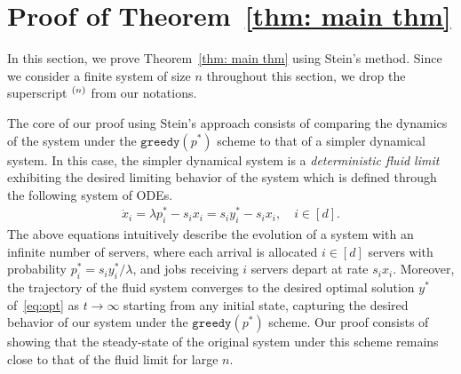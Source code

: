 \documentclass[a4paper]{article}
\theoremstyle{plain}
\newtheorem{remark}{Remark}
\theoremstyle{definition}
\theoremstyle{case}
\theoremstyle{remark}
\newcommand{\brac}[1]{\left(#1\right)}
\begin{document}
\section{Proof of Theorem~\ref{thm: main thm}}
\label{section: proofs}

In this section, we prove Theorem~\ref{thm: main thm} using Stein's method. 
Since we consider a finite system of size $n$ throughout this section, we drop the superscript $\vphantom{\cdot}^{(n)}$ from our notations.


The core of our proof using Stein’s approach consists of comparing the dynamics of the system under the $\texttt{greedy}(p^{*})$ scheme to that of a simpler dynamical system. In this case, the simpler dynamical system is a {\em deterministic fluid limit} exhibiting the desired limiting behavior of the system %
which is defined through the following system of ODEs.
\begin{align} \label{eq: ode_sub}
    \dot{x}_i  =  \lambda p_i^* -s_i x_i=s_i y_i^*-s_i x_i, \quad i \in [d].
\end{align}
% 
The above equations intuitively describe the evolution of a system with an infinite number of servers, where each arrival is allocated $i \in [d]$ servers with probability $p_i^* = s_i y_i^*/\lambda$, and jobs receiving $i$ servers depart at rate $s_i x_i$. Moreover, the trajectory of the fluid system converges to the desired optimal solution $y^*$ of~\eqref{eq:opt} as $t \to \infty$ starting from any initial state, capturing the desired behavior of our system under the $\texttt{greedy}(p^{*})$ scheme.
Our proof consists of showing that the steady-state of the original system under this scheme remains close to that of the fluid limit for large $n$.
\end{document}
